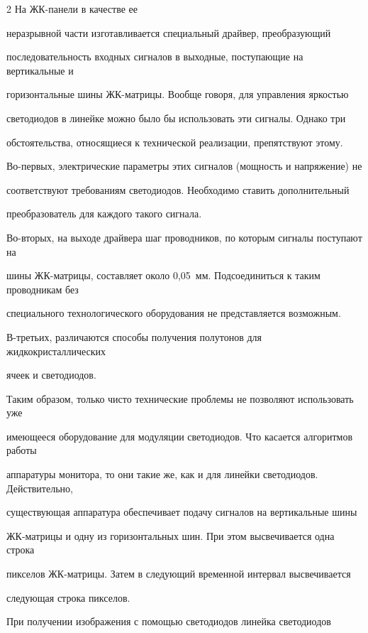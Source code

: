 \begin{multicols}{2}
На ЖК-па\-не\-ли в качестве ее 

неразрывной части изготавливается специальный драйвер, преобразующий 

последовательность входных сигналов в выходные, поступающие на вертикальные и 

горизонтальные шины ЖК-матрицы. Вообще говоря, для управления яркостью 

светодиодов в линейке можно было бы использовать эти сигналы. Однако три 

обстоятельства, относящиеся к технической реализации, препятствуют этому. 

  

  

  Во-первых, электрические параметры этих сигналов (мощность и напряжение) не 

соответствуют требованиям светодиодов. Необходимо ставить дополнительный 

преобразователь для каждого такого сигнала. 

  

  Во-вторых, на выходе драйвера шаг проводников, по которым сигналы поступают на 

шины ЖК-матрицы, составляет около 0,05~мм. Подсоединиться к таким проводникам без 

специального технологического оборудования не представляется возможным. 

  

  В-третьих, различаются способы получения полутонов для жидкокристаллических 

ячеек и светодиодов. 

  

  Таким образом, только чисто технические проблемы не позволяют использовать уже 

имеющееся оборудование для модуляции светодиодов. Что касается алгоритмов работы 

аппаратуры монитора, то они такие же, как и для линейки светодиодов. Действительно, 

существующая аппаратура обеспечивает подачу сигналов на вертикальные шины 

  ЖК-мат\-ри\-цы и одну из горизонтальных шин. При этом высвечивается одна строка 

пикселов ЖК-мат\-ри\-цы. Затем в следующий временной интервал высвечивается 

следующая строка пикселов. 

  

  При получении изображения с помощью светодиодов линейка светодиодов 


\end{multicols}
